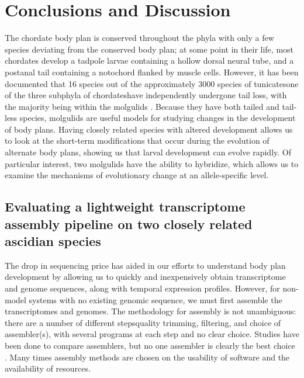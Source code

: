 \chapter{Conclusions and Discussion}

The chordate body plan is conserved throughout the phyla with only a few species deviating from the conserved body plan; at some point in their life, most chordates develop a tadpole larvae containing a hollow dorsal neural tube, and a postanal tail containing a notochord flanked by muscle cells. However, it has been documented that 16 species out of the approximately 3000 species of tunicates\textemdash one of the three subphyla of chordates\textemdash have independently undergone tail loss, with the majority being within the molgulids \cite{berrill_studies_1931,huber_evolution_2000}. Because they have both tailed and tail-less species, molgulids are useful models for studying changes in the development of body plans. Having closely related species with altered development allows us to look at the short-term modifications that occur during the evolution of alternate body plans, showing us that larval development can evolve rapidly. Of particular interest, two molgulids have the ability to hybridize, which allows us to examine the mechanisms of evolutionary change at an allele-specific level.

\section{Evaluating a lightweight transcriptome assembly pipeline on two closely related ascidian species}
The drop in sequencing price has aided in our efforts to understand body plan development by allowing us to quickly and inexpensively obtain transcriptome and genome sequences, along with temporal expression profiles. However, for non-model systems with no existing genomic sequence, we must first assemble the transcriptomes and genomes.  The methodology for assembly is not unambiguous: there are a number of different steps\textemdash quality trimming, filtering, and choice of assembler(s), with several programs at each step and no clear choice. Studies have been done to compare assemblers, but no one assembler is clearly the best choice \cite{clarke_comparative_2013}. Many times assembly methods are chosen on the usability of software and the availability of resources.

